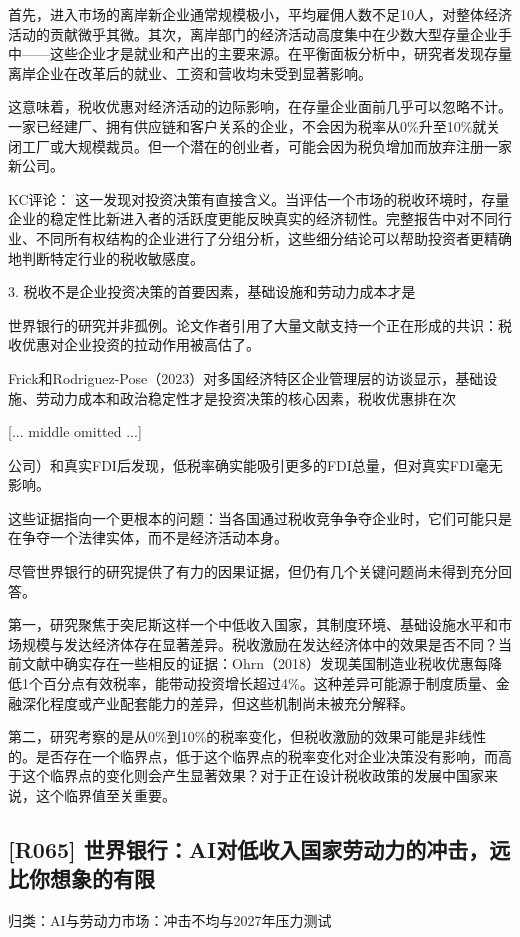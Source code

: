 \documentclass[11pt]{ctexart}
\begin{document}
首先，进入市场的离岸新企业通常规模极小，平均雇佣人数不足10人，对整体经济活动的贡献微乎其微。其次，离岸部门的经济活动高度集中在少数大型存量企业手中——这些企业才是就业和产出的主要来源。在平衡面板分析中，研究者发现存量离岸企业在改革后的就业、工资和营收均未受到显著影响。

这意味着，税收优惠对经济活动的边际影响，在存量企业面前几乎可以忽略不计。一家已经建厂、拥有供应链和客户关系的企业，不会因为税率从0\%升至10\%就关闭工厂或大规模裁员。但一个潜在的创业者，可能会因为税负增加而放弃注册一家新公司。

KC评论： 这一发现对投资决策有直接含义。当评估一个市场的税收环境时，存量企业的稳定性比新进入者的活跃度更能反映真实的经济韧性。完整报告中对不同行业、不同所有权结构的企业进行了分组分析，这些细分结论可以帮助投资者更精确地判断特定行业的税收敏感度。

3. 税收不是企业投资决策的首要因素，基础设施和劳动力成本才是

世界银行的研究并非孤例。论文作者引用了大量文献支持一个正在形成的共识：税收优惠对企业投资的拉动作用被高估了。

Frick和Rodriguez-Pose（2023）对多国经济特区企业管理层的访谈显示，基础设施、劳动力成本和政治稳定性才是投资决策的核心因素，税收优惠排在次

[... middle omitted ...]

公司）和真实FDI后发现，低税率确实能吸引更多的FDI总量，但对真实FDI毫无影响。

这些证据指向一个更根本的问题：当各国通过税收竞争争夺企业时，它们可能只是在争夺一个法律实体，而不是经济活动本身。

尽管世界银行的研究提供了有力的因果证据，但仍有几个关键问题尚未得到充分回答。

第一，研究聚焦于突尼斯这样一个中低收入国家，其制度环境、基础设施水平和市场规模与发达经济体存在显著差异。税收激励在发达经济体中的效果是否不同？当前文献中确实存在一些相反的证据：Ohrn（2018）发现美国制造业税收优惠每降低1个百分点有效税率，能带动投资增长超过4\%。这种差异可能源于制度质量、金融深化程度或产业配套能力的差异，但这些机制尚未被充分解释。

第二，研究考察的是从0\%到10\%的税率变化，但税收激励的效果可能是非线性的。是否存在一个临界点，低于这个临界点的税率变化对企业决策没有影响，而高于这个临界点的变化则会产生显著效果？对于正在设计税收政策的发展中国家来说，这个临界值至关重要。

\subsection{[R065] 世界银行：AI对低收入国家劳动力的冲击，远比你想象的有限}
{\small\color{refgray}归类：AI与劳动力市场：冲击不均与2027年压力测试}
\end{document}
